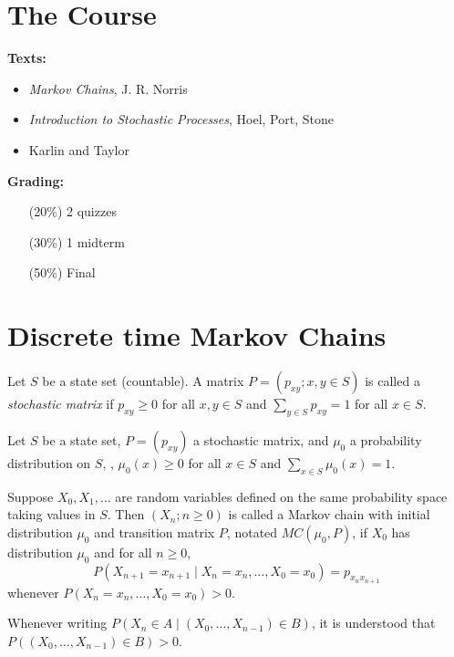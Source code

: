 
\setcounter{section}{-1}
\section{The Course} \label{sec:course}
\textbf{Texts:} \begin{itemize}
    \item \textit{Markov Chains}, J. R. Norris
    \item \textit{Introduction to Stochastic Processes}, Hoel, Port, Stone
    \item Karlin and Taylor
\end{itemize}

\textbf{Grading:} \begin{itemize}
    \item[(20\%)] 2 quizzes
    \item[(30\%)] 1 midterm
    \item[(50\%)] Final
\end{itemize}

\section{Discrete time Markov Chains} \label{sec:dtmc}
\begin{definition}
    Let $S$ be a state set (countable).
    A matrix $P = (p_{xy}; x, y \in S)$ is called a \emph{stochastic matrix} if
    $p_{xy} \ge 0$ for all $x, y \in S$ and $\sum_{y \in S} p_{xy} = 1$ for all $x \in S$.
\end{definition}

\begin{definition}
    Let $S$ be a state set, $P = (p_{xy})$ a stochastic matrix, and $\mu_0$ a
    probability distribution on $S$, \ie, $\mu_0(x) \ge 0$ for all $x \in S$ and
    $\sum_{x \in S} \mu_0(x) = 1$.

    Suppose $X_0, X_1, \dots$ are random variables defined on the same
    probability space taking values in $S$.
    Then $(X_n; n \ge 0)$ is called a Markov chain with initial distribution
    $\mu_0$ and transition matrix $P$, notated $MC(\mu_0, P)$, if $X_0$ has
    distribution $\mu_0$ and for all $n \ge 0$, \[
        P(X_{n+1} = x_{n+1} \mid X_n = x_n, \dots, X_0 = x_0) = p_{x_n x_{n+1}}
    \] whenever $P(X_n = x_n, \dots, X_0 = x_0) > 0$.
\end{definition}
\begin{notation}
    Whenever writing $P(X_n \in A \mid (X_0, \dots, X_{n-1}) \in B)$, it is
    understood that $P((X_0, \dots, X_{n-1}) \in B) > 0$.
\end{notation}

